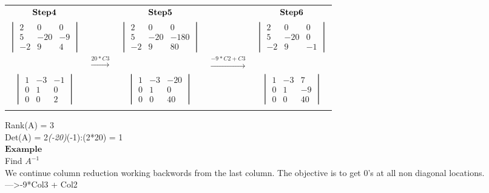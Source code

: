 \documentclass[]{article}
\begin{document}
\begin{tabular}{ c c c c c }
 $\bold{Step 4}$ &  & $\bold{Step 5}$  &  & $\bold{Step 6}$ \\
$\begin{vmatrix} 2 & 0 & 0\\ 5 & -20 & -9 \\ -2 & 9 & 4 \end{vmatrix}$ &  & $\begin{vmatrix} 2 & 0 & 0\\ 5 & -20 & -180 \\ -2 & 9 & 80 \end{vmatrix}$ &  &
$\begin{vmatrix} 2 & 0 & 0\\ 5 & -20 & 0 \\ -2 & 9 & -1 \end{vmatrix}$\\
 & $\xrightarrow{20*C3}$ &  & $\xrightarrow{-9*C2 + C3}$ & \\ 
 $\begin{vmatrix} 1 &   -3 &   -1\\ 0 &   1 &   0 \\ 0 &   0 &   2 \end{vmatrix}$ &  &
$\begin{vmatrix} 1 &   -3 &   -20\\ 0 &   1 &   0 \\ 0 &   0 &   40 \end{vmatrix}$ & &
$\begin{vmatrix} 1 &   -3 &  7\\ 0 &   1 &   -9 \\ 0 &   0 &   40 \end{vmatrix}$\\
 &  &  \\
\end{tabular}

\endgroup

Rank(A) = 3\\
 Det(A) = 2\emph{(-20)}(-1):(2*20) = 1\\

\(\mathbf{Example}\)\\
 Find \(A^{-1}\)\\
 We continue column reduction working backwords from the last column.
The objective is to get 0's at all non diagonal locations.\\

---\textgreater{}-9*Col3 + Col2\\
\end{document}
